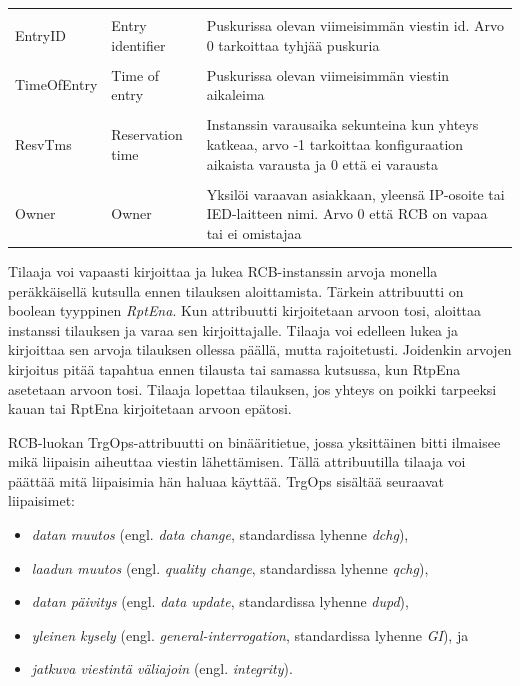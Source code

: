 \begin{table}[ht!]
\begin{tabular}{l | l | l}
		&\\
		EntryID & Entry identifier & \parbox[t]{7.5cm}{Puskurissa olevan viimeisimmän viestin id. Arvo 0 tarkoittaa tyhjää puskuria} \\
		&\\
		TimeOfEntry & Time of entry & \parbox[t]{7.5cm}{Puskurissa olevan viimeisimmän viestin aikaleima} \\
		&\\
		ResvTms & Reservation time & \parbox[t]{7.5cm}{Instanssin varausaika sekunteina kun yhteys katkeaa, arvo -1 tarkoittaa konfiguraation aikaista varausta ja 0 että ei varausta} \\
		&\\
		Owner & Owner & \parbox[t]{7.5cm}{Yksilöi varaavan asiakkaan, yleensä IP-osoite tai IED-laitteen nimi. Arvo 0 että RCB on vapaa tai ei omistajaa} \\
		\hline
	\end{tabular}
\end{table}

Tilaaja voi vapaasti kirjoittaa ja lukea RCB-instanssin arvoja monella peräkkäisellä kutsulla ennen tilauksen aloittamista. Tärkein attribuutti on boolean tyyppinen \emph{RptEna}. Kun attribuutti kirjoitetaan arvoon tosi, aloittaa instanssi tilauksen ja varaa sen kirjoittajalle. Tilaaja voi edelleen lukea ja kirjoittaa sen arvoja tilauksen ollessa päällä, mutta rajoitetusti. Joidenkin arvojen kirjoitus pitää tapahtua ennen tilausta tai samassa kutsussa, kun RtpEna asetetaan arvoon tosi. Tilaaja lopettaa tilauksen, jos yhteys on poikki tarpeeksi kauan tai RptEna kirjoitetaan arvoon epätosi.

RCB-luokan TrgOps-attribuutti on binääritietue, jossa yksittäinen bitti ilmaisee mikä liipaisin aiheuttaa viestin lähettämisen. Tällä attribuutilla tilaaja voi päättää mitä liipaisimia hän haluaa käyttää. TrgOps sisältää seuraavat liipaisimet:
\begin{itemize}
	\item \emph{datan muutos} (engl. \emph{data change}, standardissa lyhenne \emph{dchg}),
	\item \emph{laadun muutos} (engl. \emph{quality change}, standardissa lyhenne \emph{qchg}),
	\item \emph{datan päivitys} (engl. \emph{data update}, standardissa lyhenne \emph{dupd}),
	\item \emph{yleinen kysely} (engl. \emph{general-interrogation}, standardissa lyhenne \emph{GI}), ja 
	\item \emph{jatkuva viestintä väliajoin} (engl. \emph{integrity}).
\end{itemize}

